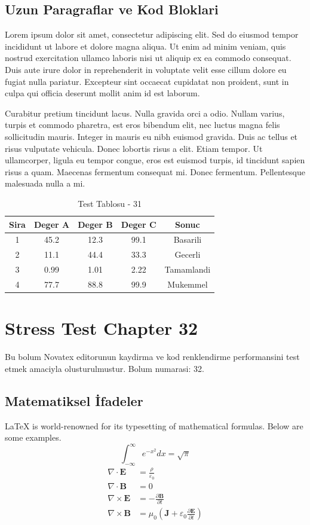 \documentclass[12pt,a4paper]{article}
\begin{document}
\subsection{Uzun Paragraflar ve Kod Bloklari}
Lorem ipsum dolor sit amet, consectetur adipiscing elit. Sed do eiusmod tempor incididunt ut labore et dolore magna aliqua. Ut enim ad minim veniam, quis nostrud exercitation ullamco laboris nisi ut aliquip ex ea commodo consequat. Duis aute irure dolor in reprehenderit in voluptate velit esse cillum dolore eu fugiat nulla pariatur. Excepteur sint occaecat cupidatat non proident, sunt in culpa qui officia deserunt mollit anim id est laborum.

Curabitur pretium tincidunt lacus. Nulla gravida orci a odio. Nullam varius, turpis et commodo pharetra, est eros bibendum elit, nec luctus magna felis sollicitudin mauris. Integer in mauris eu nibh euismod gravida. Duis ac tellus et risus vulputate vehicula. Donec lobortis risus a elit. Etiam tempor. Ut ullamcorper, ligula eu tempor congue, eros est euismod turpis, id tincidunt sapien risus a quam. Maecenas fermentum consequat mi. Donec fermentum. Pellentesque malesuada nulla a mi.

\begin{table}[h!]
\centering
\begin{tabular}{|c|c|c|c|c|}
\hline
\textbf{Sira} & \textbf{Deger A} & \textbf{Deger B} & \textbf{Deger C} & \textbf{Sonuc} \\
\hline
1 & 45.2 & 12.3 & 99.1 & Basarili \\
2 & 11.1 & 44.4 & 33.3 & Gecerli \\
3 & 0.99 & 1.01 & 2.22 & Tamamlandi \\
4 & 77.7 & 88.8 & 99.9 & Mukemmel \\
\hline
\end{tabular}
\caption{Test Tablosu - 31}
\end{table}

\newpage
\section{Stress Test Chapter 32}
Bu bolum Novatex editorunun kaydirma ve kod renklendirme performansini test etmek amaciyla olusturulmustur. Bolum numarasi: 32.

\subsection{Matematiksel İfadeler}
\LaTeX{} is world-renowned for its typesetting of mathematical formulas. Below are some examples.
\begin{equation}
\int_{-\infty}^{\infty} e^{-x^2} dx = \sqrt{\pi}
\end{equation}
\begin{align}
\nabla \cdot \mathbf{E} &= \frac{\rho}{\varepsilon_0} \\
\nabla \cdot \mathbf{B} &= 0 \\
\nabla \times \mathbf{E} &= -\frac{\partial \mathbf{B}}{\partial t} \\
\nabla \times \mathbf{B} &= \mu_0\left(\mathbf{J} + \varepsilon_0 \frac{\partial \mathbf{E}}{\partial t}\right)
\end{align}
\end{document}
